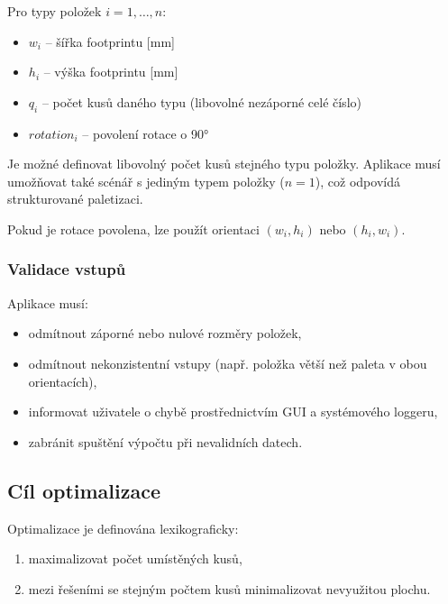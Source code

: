 \documentclass[12pt,a4paper]{article}
\begin{document}
Pro typy položek $i = 1, \dots, n$:

\begin{itemize}
    \item $w_i$ -- šířka footprintu [mm]
    \item $h_i$ -- výška footprintu [mm]
    \item $q_i$ -- počet kusů daného typu (libovolné nezáporné celé číslo)
    \item $rotation_i$ -- povolení rotace o 90°
\end{itemize}

Je možné definovat libovolný počet kusů stejného typu položky. Aplikace musí umožňovat také scénář s jediným typem položky ($n = 1$), což odpovídá strukturované paletizaci.

Pokud je rotace povolena, lze použít orientaci $(w_i, h_i)$ nebo $(h_i, w_i)$.

\subsubsection*{Validace vstupů}

Aplikace musí:

\begin{itemize}
    \item odmítnout záporné nebo nulové rozměry položek,
    \item odmítnout nekonzistentní vstupy (např. položka větší než paleta
    v obou orientacích),
    \item informovat uživatele o chybě prostřednictvím GUI
    a systémového loggeru,
    \item zabránit spuštění výpočtu při nevalidních datech.
\end{itemize}

\subsection{Cíl optimalizace}

Optimalizace je definována lexikograficky:

\begin{enumerate}
    \item maximalizovat počet umístěných kusů,
    \item mezi řešeními se stejným počtem kusů minimalizovat nevyužitou plochu.
\end{enumerate}
\end{document}
